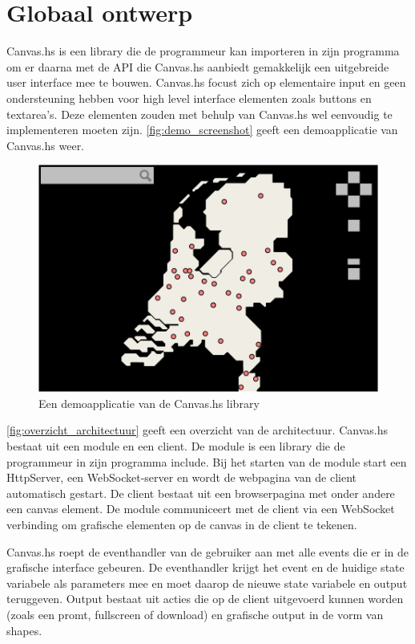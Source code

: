 \section{Globaal ontwerp}  \label{sec:globaal}
Canvas.hs is een library die de programmeur kan importeren in zijn programma om er daarna met de API die Canvas.hs aanbiedt gemakkelijk een uitgebreide user interface mee te bouwen. Canvas.hs focust zich op elementaire input en geen ondersteuning hebben voor high level interface elementen zoals buttons en textarea's. Deze elementen zouden met behulp van Canvas.hs wel eenvoudig te implementeren moeten zijn. \autoref{fig:demo_screenshot} geeft een demoapplicatie van Canvas.hs weer.


\begin{figure}
\begin{center}
\includegraphics[keepaspectratio,width=\textwidth]{./images/demo.png}
\caption{Een demoapplicatie van de Canvas.hs library}
\label{fig:demo_screenshot}
\end{center}
\end{figure}


\autoref{fig:overzicht_architectuur} geeft een overzicht van de architectuur. Canvas.hs bestaat uit een module en een client. De module is een library die de programmeur in zijn programma include. Bij het starten van de module start een HttpServer, een WebSocket-server en wordt de webpagina van de client automatisch gestart. De client bestaat uit een browserpagina met onder andere een canvas element. De module communiceert met de client via een WebSocket verbinding om grafische elementen op de canvas in de client te tekenen.


Canvas.hs roept de eventhandler van de gebruiker aan met alle events die er in de grafische interface gebeuren. De eventhandler krijgt het event en de huidige state variabele als parameters mee en moet daarop de nieuwe state variabele en output teruggeven. Output bestaat uit acties die op de client uitgevoerd kunnen worden (zoals een promt, fullscreen of download) en grafische output in de vorm van shapes.

